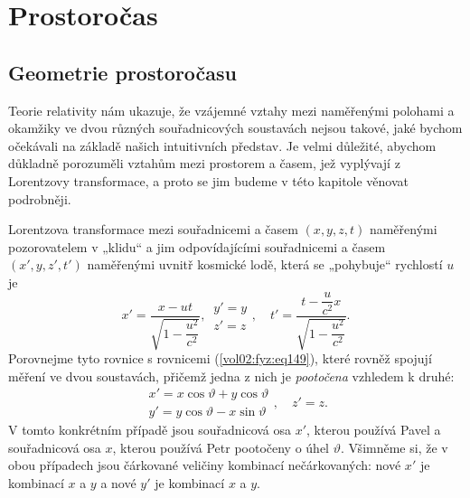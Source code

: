 \setchaptertoc
\chapter{Prostoročas}\label{fyz:IchapXVII}

  \section{Geometrie prostoročasu}\label{fyz:IchapXVIIsecI}
    Teorie relativity nám ukazuje, že vzájemné vztahy mezi naměřenými polohami a okamžiky ve dvou 
    různých souřadnicových soustavách nejsou takové, jaké bychom očekávali na základě našich 
    intuitivních představ. Je velmi důležité, abychom důkladně porozuměli vztahům mezi prostorem a 
    časem, jež vyplývají z Lorentzovy transformace, a proto se jim budeme v této kapitole věnovat 
    podrobněji.
    
    Lorentzova transformace mezi souřadnicemi a časem \((x, y, z, t)\) naměřenými pozorovatelem v
    „klidu“ a jim odpovídajícími souřadnicemi a časem \((x', y, z', t')\) naměřenými uvnitř kosmické
    lodě, která se „pohybuje“ rychlostí \(u\) je
    \begin{equation}\label{fyz:eq220}
      x' = \frac{x - ut}{\sqrt{1-\dfrac{u^2}{c^2}}}, \,
      \begin{array}{c}
        y' = y \\ 
        z' = z
      \end{array}\!,                         \quad
      t' = \frac{t-\dfrac{u}{c^2}x}{\sqrt{1-\dfrac{u^2}{c^2}}}. 
    \end{equation} 
    Porovnejme tyto rovnice s rovnicemi (\ref{vol02:fyz:eq149}), které rovněž spojují měření ve dvou
    soustavách, přičemž jedna z nich je \emph{pootočena} vzhledem k druhé:
    \begin{equation}\label{fyz:eq221}
      \begin{array}{c}
        x' = x\cos\vartheta + y\cos\vartheta \\
        y' = y\cos\vartheta - x\sin\vartheta 
      \end{array},\quad
        z' = z.
    \end{equation}
    V tomto konkrétním případě jsou souřadnicová osa \(x'\), kterou používá Pavel a souřadnicová 
    osa \(x\), kterou používá Petr pootočeny o úhel \(\vartheta\). Všimněme si, že v obou případech 
    jsou čárkované veličiny kombinací nečárkovaných: nové \(x'\) je kombinací \(x\) a \(y\) a nové 
    \(y'\) je kombinací \(x\) a \(y\).
    
